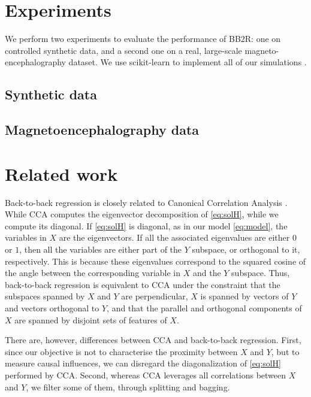 \documentclass{article}
\begin{document}
\section{Experiments}

We perform two experiments to evaluate the performance of BB2R: one on controlled synthetic data, and a second one on a real, large-scale magneto-encephalography dataset.
%
We use scikit-learn to implement all of our simulations \citep{sklearn}.

\subsection{Synthetic data}
\label{sec:experiment_synthetic}



\subsection{Magnetoencephalography data}
\label{sec:experiment_real}



\section{Related work}

Back-to-back regression is closely related to Canonical Correlation Analysis \citep{cca_hotelling}.
%
While CCA computes the eigenvector decomposition of \eqref{eq:solH}, while we compute its diagonal.
%
If \eqref{eq:solH} is diagonal, as in our model \eqref{eq:model}, the variables in $X$ are the eigenvectors.
%
If all the associated eigenvalues are either $0$ or $1$, then all the variables are either part of the $Y$ subspace, or orthogonal to it, respectively.
%
This is because these eigenvalues correspond to the squared cosine of the angle between the corresponding variable in $X$ and the $Y$ subspace.
%
Thus, back-to-back regression is equivalent to CCA under the constraint that the subspaces spanned by $X$ and $Y$ are perpendicular, $X$ is spanned by vectors of $Y$ and vectors orthogonal to $Y$, and that the parallel and orthogonal components of $X$ are spanned by disjoint sets of features of $X$.

There are, however, differences between CCA and back-to-back regression.
%
First, since our objective is not to characterise the proximity between $X$ and $Y$, but to measure causal influences, we can disregard the diagonalization of \eqref{eq:solH} performed by CCA.
%
Second, whereas CCA leverages all correlations between $X$ and $Y$, we filter some of them, through splitting and bagging.
\end{document}
